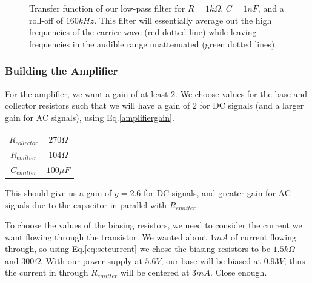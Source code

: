 \documentclass[12pt]{article}
\begin{document}
\begin{figure}[H]
\caption{Transfer function of our low-pass filter for $R =1k\Omega$, $C=1nF$, and a roll-off of $160kHz$. This filter will essentially average out the high frequencies of the carrier wave (red dotted line) while leaving frequencies in the audible range unattenuated (green dotted lines).}
\label{fig:lowpasstransfer}
\end{figure}

\subsubsection*{Building the Amplifier}
For the amplifier, we want a gain of at least 2. We choose values for the base and collector resistors such that we will have a gain of 2 for DC signals (and a larger gain for AC signals), using Eq.\ref{amplifiergain}. 
\begin{center}
  \begin{tabular}{ c  c }
    $R_{collector}$ & $270\Omega$ \\
    $R_{emitter}$ & $104\Omega$  \\
    $C_{emitter}$ & $100\mu F$\\
  \end{tabular}
\end{center}
This should give us a gain of $g=2.6$ for DC signals, and greater gain for AC signals due to the capacitor in parallel with $R_{emitter}$.

To choose the values of the biasing resistors, we need to consider the current we want flowing through the transistor. We wanted about $1mA$ of current flowing through, so using Eq.\ref{eq:setcurrent} we chose the biasing resistors to be $1.5k\Omega$ and $300\Omega$. With our power supply at $5.6V$, our base will be biased at $0.93V$; thus the current in through $R_{emitter}$ will be centered at $3mA$. Close enough.
\end{document}
